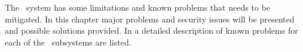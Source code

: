 The \appName\ system has some limitations and known problems that needs to be
mitigated. In this chapter major problems and security issues will be presented
and possible solutions provided. In  a detailed
description of known problems for each of the \appName\ subsystems are listed.

